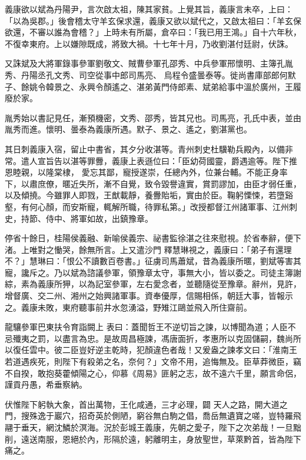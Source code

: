 \begin{pinyinscope}
 義康欲以斌為丹陽尹，言次啟太祖，陳其家貧。上覺其旨，義康言未卒，上曰：「以為吳郡。」後會稽太守羊玄保求還，義康又欲以斌代之，又啟太祖曰：「羊玄保欲還，不審以誰為會稽？」上時未有所屬，倉卒曰：「我已用王鴻。」自十六年秋，不復幸東府。上以嫌隙既成，將致大禍。十七年十月，乃收劉湛付廷尉，伏誅。



 又誅斌及大將軍錄事參軍劉敬文、賊曹參軍孔邵秀、中兵參軍邢懷明、主簿孔胤秀、丹陽丞孔文秀、司空從事中郎司馬亮、
 烏程令盛曇泰等。徙尚書庫部郎何默子、餘姚令韓景之、永興令顏遙之、湛弟黃門侍郎素、斌弟給事中溫於廣州，王履廢於家。



 胤秀始以書記見任，漸預機密，文秀、邵秀，皆其兄也。司馬亮，孔氏中表，並由胤秀而進。懷明、曇泰為義康所遇。默子、景之、遙之，劉湛黨也。



 其日刺義康入宿，留止中書省，其夕分收湛等。青州刺史杜驥勒兵殿內，以備非常。遣人宣旨告以湛等罪釁，義康上表遜位曰：「臣幼荷國靈，爵遇逾等。陛下推恩睦親，以隆棠棣，
 愛忘其鄙，寵授遂崇，任總內外，位兼台輔。不能正身率下，以肅庶僚，暱近失所，漸不自覺，致令毀譽違實，賞罰謬加，由臣才弱任重，以及傾撓。今雖罪人即戮，王猷載靜，養釁貽垢，實由於臣。鞠躬慄悚，若墮谿壑，有何心顏，而安斯寵，輒解所職，待罪私第。」改授都督江州諸軍事、江州刺史，持節、侍中、將軍如故，出鎮豫章。



 停省十餘日，桂陽侯義融、新喻侯義宗、祕書監徐湛之往來慰視。於省奉辭，便下渚。上唯對之慟哭，餘無所言。上又遣沙門
 釋慧琳視之，義康曰：「弟子有還理不？」慧琳曰：「恨公不讀數百卷書。」征虜司馬蕭斌，昔為義康所暱，劉斌等害其寵，讒斥之。乃以斌為諮議參軍，領豫章太守，事無大小，皆以委之。司徒主簿謝綜，素為義康所狎，以為記室參軍，左右愛念者，並聽隨從至豫章。辭州，見許，增督廣、交二州、湘州之始興諸軍事。資奉優厚，信賜相係，朝廷大事，皆報示之。義康未敗，東府聽事前井水忽湧溢，野雉江鷗並飛入所住齋前。



 龍驤參軍巴東扶令育詣闕上
 表曰：蓋聞哲王不逆切旨之諫，以博聞為道；人臣不忌殲夷之罰，以盡言為忠。是故周昌極諫，馮唐面折，孝惠所以克固儲嗣，魏尚所以復任雲中。彼二臣豈好逆主乾時，犯顏違色者哉！又爰盎之諫孝文曰：「淮南王若道遇疾死，則陛下有殺弟之名，奈何？」文帝不用，追悔無及。臣草莽微臣，竊不自揆，敢抱葵藿傾陽之心，仰慕《周易》匪躬之志，故不遠六千里，願言命侶，謹貢丹愚，希垂察納。



 伏惟陛下躬執大象，首出萬物，王化咸通，三才必理，闢
 天人之路，開大道之門，搜殊逸于巖穴，招奇英於側陋，窮谷無白駒之倡，喬岳無遺寶之嗟，豈特羅飛翮于垂天，網沈鱗於溟海。況於彭城王義康，先朝之愛子，陛下之次弟哉！一旦黜削，遠送南服，恩絕於內，形隔於遠，躬離明主，身放聖世，草萊黔首，皆為陛下痛之。




\end{pinyinscope}
